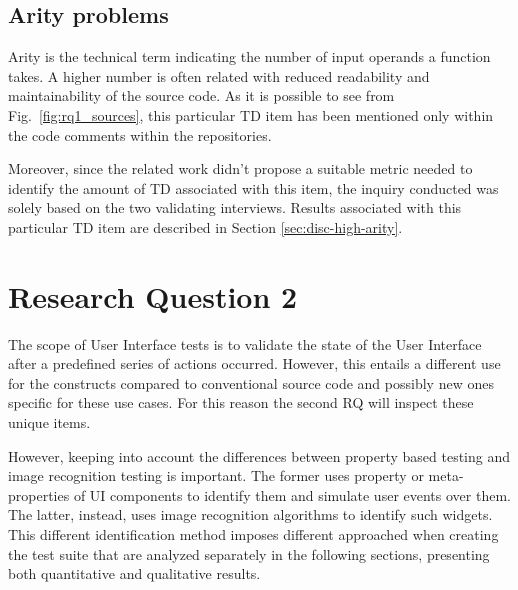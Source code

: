 \subsection{Arity problems}
Arity is the technical term indicating the number of input operands a function takes. A higher number is often related with reduced readability and maintainability of the source code. As it is possible to see from Fig.\ \ref{fig:rq1_sources}, this particular TD item has been mentioned only within the code comments within the repositories.

Moreover, since the related work didn't propose a suitable metric needed to identify the amount of TD associated with this item, the inquiry conducted was solely based on the two validating interviews. Results associated with this particular TD item are described in Section \ref{sec:disc-high-arity}.


\FloatBarrier

\section{Research Question 2}
%
The scope of User Interface tests is to validate the state of the User Interface after a predefined series of actions occurred. However, this entails a different use for the constructs compared to conventional source code and possibly new ones specific for these use cases. For this reason the second RQ will inspect these unique items.

However, keeping into account the differences between property based testing and image recognition testing is important. The former uses property or meta-properties of UI components to identify them and simulate user events over them. The latter, instead, uses image recognition algorithms to identify such widgets. This different identification method imposes different approached when creating the test suite that are analyzed separately in the following sections, presenting both quantitative and qualitative results.



